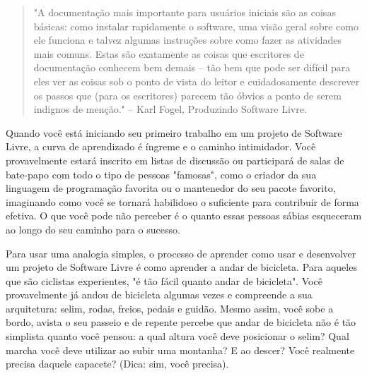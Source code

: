 

\begin{quote}
"A documentação mais importante para usuários iniciais são as coisas básicas: como
instalar rapidamente o software, uma visão geral sobre como ele funciona e talvez
algumas instruções sobre como fazer as atividades mais comuns. Estas são exatamente
as coisas que escritores de documentação conhecem bem demais -- tão bem que pode ser
difícil para eles ver as coisas sob o ponto de vista do leitor e cuidadosamente descrever
os passos que (para os escritores) parecem tão óbvios a ponto de serem indignos de menção."
-- Karl Fogel, Produzindo Software Livre.
\end{quote}

Quando você está iniciando seu primeiro trabalho em um projeto de Software Livre,
a curva de aprendizado é íngreme e o caminho intimidador. Você provavelmente estará inscrito
em listas de discussão ou participará de salas de bate-papo com todo o tipo de pessoas "famosas",
como o criador da sua linguagem de programação favorita ou o mantenedor do seu pacote favorito,
imaginando como você se tornará habilidoso o suficiente para contribuir de forma efetiva. O que
você pode não perceber é o quanto essas pessoas sábias esqueceram ao longo do seu caminho para o
sucesso.

Para usar uma analogia simples, o processo de aprender como usar e desenvolver um
projeto de Software Livre é como aprender a andar de bicicleta. Para aqueles que são
ciclistas experientes, "é tão fácil quanto andar de bicicleta". Você provavelmente já
andou de bicicleta algumas vezes e compreende a sua arquitetura: selim, rodas,
freios, pedais e guidão. Mesmo assim, você sobe a bordo, avista o seu passeio e de repente
percebe que andar de bicicleta não é tão simplista quanto você pensou: a qual altura
você deve posicionar o selim? Qual marcha você deve utilizar ao subir uma montanha?
E ao descer? Você realmente precisa daquele capacete? (Dica: sim, você precisa).

